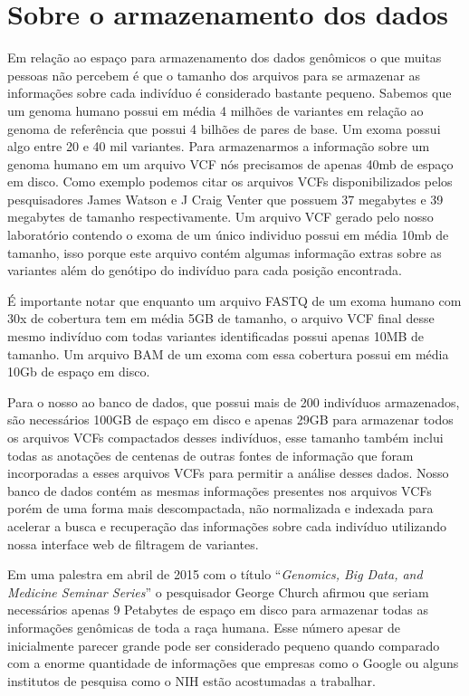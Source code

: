 \section{Sobre o armazenamento dos dados}

Em relação ao espaço para armazenamento dos dados genômicos o que muitas pessoas não percebem é que o tamanho dos arquivos para se armazenar as informações sobre cada indivíduo é considerado bastante pequeno. Sabemos que um genoma humano possui em média 4 milhões de variantes em relação ao genoma de referência que possui 4 bilhões de pares de base. Um exoma possui algo entre 20 e 40 mil variantes. Para armazenarmos a informação sobre um genoma humano em um arquivo VCF nós precisamos de apenas 40mb de espaço em disco. Como exemplo podemos citar os arquivos VCFs disponibilizados pelos pesquisadores James Watson e J Craig Venter que possuem 37 megabytes e 39 megabytes de tamanho respectivamente. Um arquivo VCF gerado pelo nosso laboratório contendo o exoma de um único individuo possui em média 10mb de tamanho, isso porque este arquivo contém algumas informação extras sobre as variantes além do genótipo do indivíduo para cada posição encontrada.

É importante notar que enquanto um arquivo FASTQ de um exoma humano com 30x de cobertura tem em média 5GB de tamanho, o arquivo VCF final desse mesmo indivíduo com todas variantes identificadas possui apenas 10MB de tamanho. Um arquivo BAM de um exoma com essa cobertura possui em média 10Gb de espaço em disco.

Para o nosso ao banco de dados, que possui mais de 200 indivíduos armazenados, são necessários 100GB de espaço em disco e apenas 29GB para armazenar todos os arquivos VCFs compactados desses indivíduos, esse tamanho também inclui todas as anotações de centenas de outras fontes de informação que foram incorporadas a esses arquivos VCFs para permitir a análise desses dados. Nosso banco de dados contém as mesmas informações presentes nos arquivos VCFs porém de uma forma mais descompactada, não normalizada e indexada para acelerar a busca e recuperação das informações sobre cada indivíduo utilizando nossa interface web de filtragem de variantes.

Em uma palestra em abril de 2015 com o título ``\textit{Genomics, Big Data, and Medicine Seminar Series}'' o pesquisador George Church afirmou que seriam necessários apenas 9 Petabytes de espaço em disco para armazenar todas as informações genômicas de toda a raça humana. Esse número apesar de inicialmente parecer grande pode ser considerado pequeno quando comparado com a enorme quantidade de informações que empresas como o Google ou alguns institutos de pesquisa como o NIH estão acostumadas a trabalhar.

